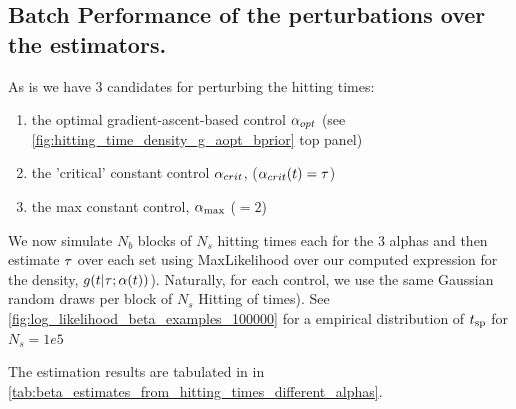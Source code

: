\documentclass{article}
\begin{document}
\clearpage



\subsection{Batch Performance of the perturbations over the estimators.}
As is we have 3 candidates for perturbing the hitting times: 
\begin{enumerate}
  \item 
the optimal gradient-ascent-based  control ${\alpha}_{opt}$ (see
\cref{fig:hitting_time_density_g_aopt_bprior} top panel)
\item   the 'critical' constant control
${\alpha}_{crit}$, (${\alpha}_{crit}(t) =  { \tau }$)
\item  the max constant control, ${ {\alpha}_{\textrm{max}} }$ ($=2$)
\end{enumerate} 

We now simulate $N_b $ blocks of $N_s $ hitting times each for the
3 alphas and then estimate ${ \tau }$ over each set using MaxLikelihood over our
computed expression for the density, $g(t|{ \tau }; {\alpha}(t) )$). 
Naturally, for each control, we use the same Gaussian random draws per block of
$N_s$ Hitting of times). See \cref{fig:log_likelihood_beta_examples_100000} for
a empirical distribution of ${ t_{\textrm{sp} } }$ for $N_s = 1e5$

The estimation results are tabulated in in
\cref{tab:beta_estimates_from_hitting_times_different_alphas}.
\end{document}
